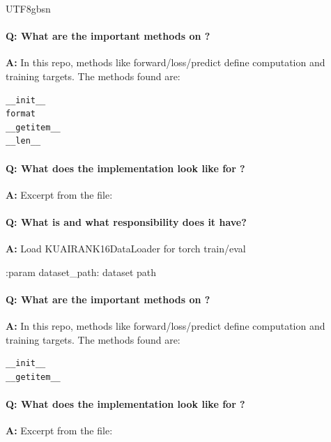 \documentclass[11pt]{article}
\begin{document}
\begin{CJK*}{UTF8}{gbsn}
\paragraph{Q: What are the important methods on \texttt{}?}
\textbf{A:} In this repo, methods like forward/loss/predict define computation and training targets. The methods found are:

\begin{Verbatim}[fontsize=\small]
__init__
format
__getitem__
__len__
\end{Verbatim}

\paragraph{Q: What does the implementation look like for \texttt{}?}
\textbf{A:} Excerpt from the file:

\vspace{1mm}


\paragraph{Q: What is \texttt{} and what responsibility does it have?}
\textbf{A:} Load KUAIRANK16DataLoader for torch train/eval

:param dataset\_path: dataset path

\paragraph{Q: What are the important methods on \texttt{}?}
\textbf{A:} In this repo, methods like forward/loss/predict define computation and training targets. The methods found are:

\begin{Verbatim}[fontsize=\small]
__init__
__getitem__
\end{Verbatim}

\paragraph{Q: What does the implementation look like for \texttt{}?}
\textbf{A:} Excerpt from the file:

\vspace{1mm}



\end{CJK*}
\end{document}
